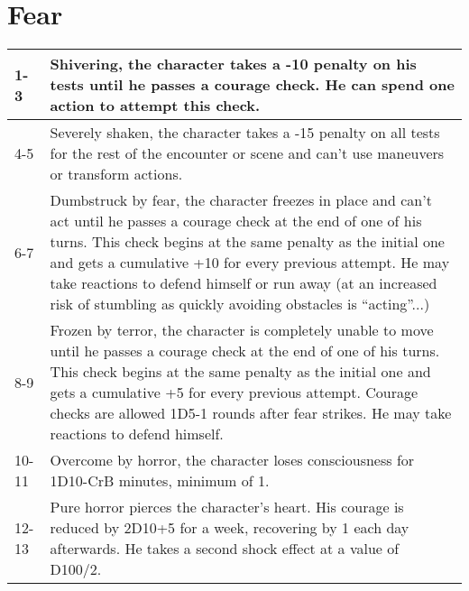 	\section{Fear}
\label{feartable}
\begin{tabularx}{\textwidth}{|l|X|}
	\hline
	1-3    & Shivering, the character takes a -10 penalty on his tests until he passes a courage check. He can spend one action to attempt this check.                                                                                                                                                                                                                                            \\ \hline
	4-5   & Severely shaken, the character takes a -15 penalty on all tests for the rest of the encounter or scene and can't use maneuvers or transform actions.                                                                                                                                                                                                                                 \\ \hline
	6-7   & Dumbstruck by fear, the character freezes in place and can’t act until he passes a courage check at the end of one of his turns. This check begins at the same penalty as the initial one and gets a cumulative +10 for every previous attempt. He may take reactions to defend himself or run away (at an increased risk of stumbling as quickly avoiding obstacles is “acting”...) \\ \hline
	8-9   & Frozen by terror, the character is completely unable to move until he passes a courage check at the end of one of his turns. This check begins at the same penalty as the initial one and gets a cumulative +5 for every previous attempt. Courage checks are allowed 1D5-1 rounds after fear strikes. He may take reactions to defend himself.                                      \\ \hline
	10-11  & Overcome by horror, the character loses consciousness for 1D10-CrB minutes, minimum of 1.                                                                                                                                                                                                                                                                                            \\ \hline
	12-13  & Pure horror pierces the character’s heart. His courage is reduced by 2D10+5 for a week, recovering by 1 each day afterwards. He takes a second shock effect at a value of D100/2.                                                                                                                                                                                                    \\ \hline

\end{tabularx}
